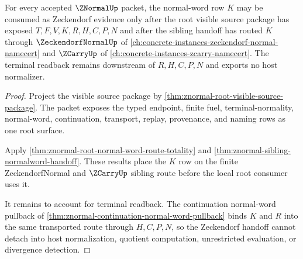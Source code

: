 \begin{theorem}
\label{thm:znormal-root-zeckendorf-handoff}
For every accepted $\ZNormalUp$ packet, the normal-word row $K$ may be consumed as Zeckendorf evidence only after the root visible source package has exposed $T,F,V,K,R,H,C,P,N$ and after the sibling handoff has routed $K$ through $\ZeckendorfNormalUp$ of \autoref{ch:concrete-instances-zeckendorf-normal-namecert} and $\ZCarryUp$ of \autoref{ch:concrete-instances-zcarry-namecert}. The terminal readback remains downstream of $R,H,C,P,N$ and exports no host normalizer.
\end{theorem}
\begin{proof}
Project the visible source package by \autoref{thm:znormal-root-visible-source-package}. The packet exposes the typed endpoint, finite fuel, terminal-normality, normal-word, continuation, transport, replay, provenance, and naming rows as one root surface.

Apply \autoref{thm:znormal-root-normal-word-route-totality} and \autoref{thm:znormal-sibling-normalword-handoff}. These results place the $K$ row on the finite ZeckendorfNormal and $\ZCarryUp$ sibling route before the local root consumer uses it.

It remains to account for terminal readback. The continuation normal-word pullback of \autoref{thm:znormal-continuation-normal-word-pullback} binds $K$ and $R$ into the same transported route through $H,C,P,N$, so the Zeckendorf handoff cannot detach into host normalization, quotient computation, unrestricted evaluation, or divergence detection.
\end{proof}

